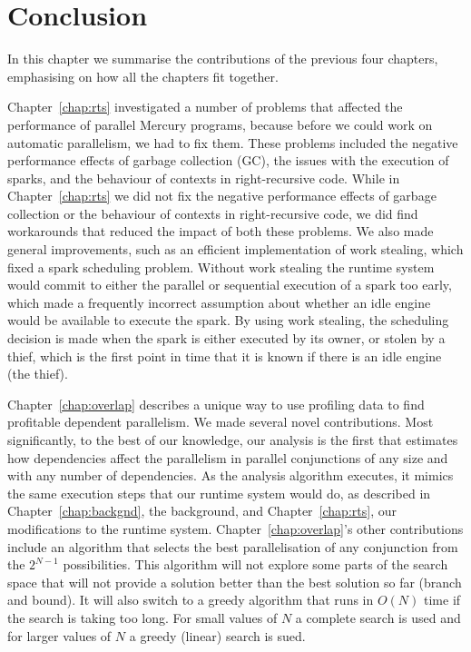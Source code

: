 
\chapter{Conclusion}
\label{chap:conc}


In this chapter we summarise the contributions of the previous four
chapters,
emphasising on how all the chapters fit together.

Chapter~\ref{chap:rts}
investigated a number of problems that affected the performance of parallel
Mercury programs,
because before we could work on automatic parallelism,
we had to fix them.
These problems included the negative performance effects of garbage collection (GC),
the issues with the execution of sparks,
and the behaviour of contexts in right-recursive code.
While in Chapter~\ref{chap:rts} we did not fix the negative performance
effects of garbage collection or
the behaviour of contexts in right-recursive code,
we did find workarounds that reduced the impact of both these problems.
We also made general improvements, such as an efficient implementation of
work stealing,
which fixed a spark scheduling problem.
Without work stealing the runtime system would commit to either the parallel
or sequential execution of a spark too early,
which made a frequently incorrect assumption about whether an idle engine
would be available to execute the spark.
By using work stealing,
the scheduling decision is made when the spark is either executed by its
owner, or stolen by a thief,
which is the first point in time that it is known if there is an idle
engine (the thief).

Chapter~\ref{chap:overlap} describes a unique way to use profiling data to
find profitable dependent parallelism.
We made several novel contributions.
Most significantly, to the best of our knowledge,
our analysis is the first that estimates how dependencies affect
the parallelism in parallel conjunctions of any size
and with any number of dependencies.
As the analysis algorithm executes,
it mimics the same execution steps that our runtime system would do,
as described in Chapter~\ref{chap:backgnd}, the background, and
Chapter~\ref{chap:rts}, our modifications to the runtime system.
Chapter~\ref{chap:overlap}'s other contributions include
an algorithm that selects the best parallelisation of any conjunction from
the $2^{N-1}$ possibilities.
This algorithm will not explore some parts of the search space that will not
provide a solution better than the best solution so far (branch and bound).
It will also switch to a greedy algorithm that runs in $O(N)$ time if the
search is taking too long.
For small values of $N$ a complete search is used and for larger values of
$N$ a greedy (linear) search is sued.

